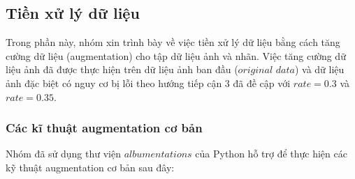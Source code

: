 \documentclass[a4paper,12pt]{article}
\begin{document}
\subsection{Tiền xử lý dữ liệu}
Trong phần này, nhóm xin trình bày về việc tiền xử lý dữ liệu bằng cách tăng cường dữ liệu (augmentation) cho tập dữ liệu ảnh và nhãn. Việc tăng cường dữ liệu ảnh đã được thực hiện trên dữ liệu ảnh ban đầu ($original$ $data$) và dữ liệu ảnh đặc biệt có nguy cơ bị lỗi theo hướng tiếp cận 3 đã đề cập với $rate=0.3$ và $rate=0.35$.
\subsubsection{Các kĩ thuật augmentation cơ bản}
Nhóm đã sử dụng thư viện $albumentations$ của Python hỗ trợ để thực hiện các kỹ thuật augmentation cơ bản sau đây:
\end{document}
